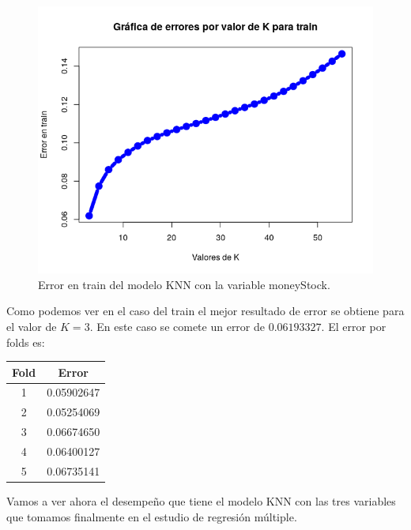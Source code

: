 \documentclass[12pt,a4paper]{article}
\begin{document}
\begin{figure}[H]
	\centering 
	\includegraphics[scale=0.6]{./Imagenes/Regresion/knn4.png}
	\caption{Error en train del modelo KNN con la variable moneyStock.}
\end{figure}

Como podemos ver en el caso del train el mejor resultado de error se obtiene para el valor de $K=3$. En este caso se comete un error de $0.06193327$. El error por folds es:

\begin{table}[H]
	\centering
	\begin{tabular}{|c|c|}
		\hline
		\textbf{Fold} & \textbf{Error} \\ \hline
		1              & 0.05902647     \\ \hline
		2              & 0.05254069     \\ \hline
		3              & 0.06674650     \\ \hline
		4              & 0.06400127     \\ \hline
		5              & 0.06735141     \\ \hline
	\end{tabular}
\end{table}

Vamos a ver ahora el desempeño que tiene el modelo KNN con las tres variables que tomamos finalmente en el estudio de regresión múltiple.
\end{document}
